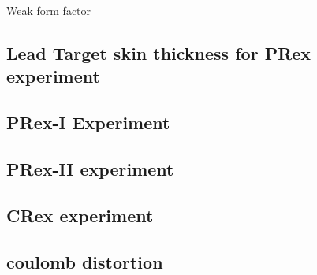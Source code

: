 Weak form factor

\subsection{Lead Target skin thickness for PRex experiment}

\subsection{PRex-I Experiment}
\subsection{PRex-II experiment}
\subsection{CRex experiment}
\subsection{coulomb distortion}









